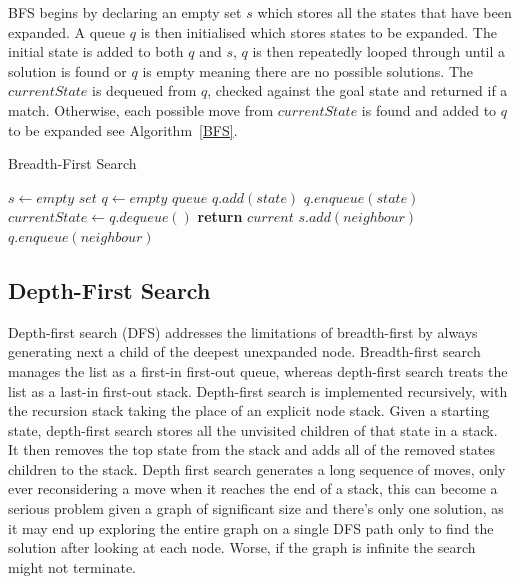 \documentclass[final]{cmpreport}
\begin{document}
BFS begins by declaring an empty set $s$ which stores all the states that have been expanded. A queue $q$ is then initialised which stores states to be expanded. The initial state is added to both $q$ and $s$, $q$ is then repeatedly looped through until a solution is found or $q$ is empty meaning there are no possible solutions. The $currentState$ is dequeued from $q$, checked against the goal state and returned if a match. Otherwise, each possible move from $currentState$ is found and added to $q$ to be expanded see Algorithm~\ref{BFS}.
	\begin{algorithm}
	\caption{Breadth-First Search}\label{BFS}
	\begin{algorithmic}[1]
		\State $s \gets \textit{empty set}$
		\State $q \gets \textit{empty queue}$
		\State $q.add(state)$
		\State $q.enqueue(state)$
		\State $currentState \gets q.dequeue()$
		\State \textbf{return} $current$
		\EndIf
		\State $s.add(neighbour)$
		\State $q.enqueue(neighbour)$
		\EndIf
		
		\EndFor
		\EndWhile
		\EndProcedure
	\end{algorithmic}
\end{algorithm}


\subsection{Depth-First Search}
Depth-first search (DFS) addresses the limitations of breadth-first by always generating next a child of the deepest unexpanded node. Breadth-first search manages the list as a first-in first-out queue, whereas depth-first search treats the list as a last-in first-out stack. Depth-first search is implemented recursively, with the recursion stack taking the place of an explicit node stack. Given a starting state, depth-first search stores all the unvisited children of that state in a stack. It then removes the top state from the stack and adds all of the removed states children to the stack. Depth first search generates a long sequence of moves, only ever reconsidering a move when it reaches the end of a stack, this can become a serious problem given a graph of significant size and there's only one solution, as it may end up exploring the entire graph on a single DFS path only to find the solution after looking at each node. Worse, if the graph is infinite the search might not terminate.
\end{document}

